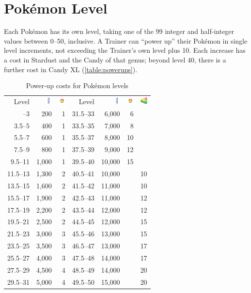 \section{Pokémon Level}
\label{sec:plevel}
Each Pokémon has its own level, taking one of the 99 integer and half-integer
 values between 0--50, inclusive.
A Trainer can ``power up'' their Pokémon in single level increments,
 not exceeding the Trainer's own level plus 10.
Each increase has a cost in Stardust and the Candy of that genus; beyond level 40, there
  is a further cost in Candy XL (\autoref{table:powerups}).
\begin{table}
\centering
\begin{tabular}[ht]{rrr|rrrr}
Level &
\includegraphics[width=1em,height=1em]{images/stardust.png} &
\includegraphics[width=1em,height=1em]{images/rarecandy.png} &
Level &
\includegraphics[width=1em,height=1em]{images/stardust.png} &
\includegraphics[width=1em,height=1em]{images/rarecandy.png} &
\includegraphics[width=1em,height=1em]{images/rarecandyxl.png} \\
\Midrule
1.5--3 &   200 & 1 & 31.5--33 &  6,000 &  6 & \\
3.5--5 &   400 & 1 & 33.5--35 &  7,000 &  8 & \\
5.5--7 &   600 & 1 & 35.5--37 &  8,000 & 10 & \\
7.5--9 &   800 & 1 & 37.5--39 &  9,000 & 12 & \\
9.5--11 & 1,000 & 1 & 39.5--40 & 10,000 & 15 & \\
11.5--13 & 1,300 & 2 & 40.5--41 & 10,000 &    & 10 \\
13.5--15 & 1,600 & 2 & 41.5--42 & 11,000 &    & 10 \\
15.5--17 & 1,900 & 2 & 42.5--43 & 11,000 &    & 12 \\
17.5--19 & 2,200 & 2 & 43.5--44 & 12,000 &    & 12 \\
19.5--21 & 2,500 & 2 & 44.5--45 & 12,000 &    & 15 \\
21.5--23 & 3,000 & 3 & 45.5--46 & 13,000 &    & 15 \\
23.5--25 & 3,500 & 3 & 46.5--47 & 13,000 &    & 17 \\
25.5--27 & 4,000 & 3 & 47.5--48 & 14,000 &    & 17 \\ 
27.5--29 & 4,500 & 4 & 48.5--49 & 14,000 &    & 20 \\
29.5--31 & 5,000 & 4 & 49.5--50 & 15,000 &    & 20 \\
\end{tabular}
\caption{Power-up costs for Pokémon levels}
\label{table:powerups}
\end{table}
